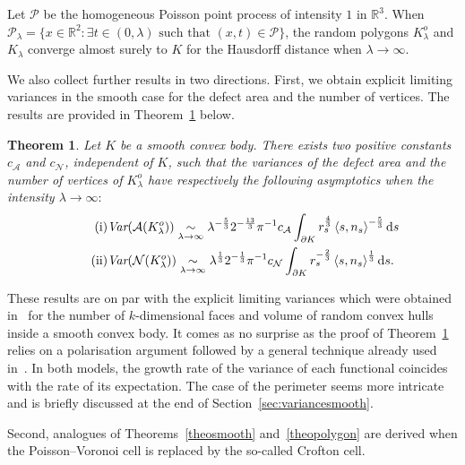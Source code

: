 \documentclass[10pt]{amsart}
\newtheorem{theo}{Theorem}[section]
\theoremstyle{definition}\newtheorem{defi}[theo]{Definition}\newtheorem{rema}[theo]{Remark}\newtheorem{exam}[theo]{Example}\newtheorem{exem}[theo]{Example}\newtheorem{nota}[theo]{Notation}
\newcommand{\cA}{\mathcal{A}}
\newcommand{\cN}{\mathcal{N}}
\newcommand{\cP}{\mathcal{P}}
\newcommand{\dd}{\mathrm{d}}
\newcommand{\R}{\mathbb{R}}
\newcommand{\pass}{\vspace{0.3cm}\noindent}
\let\oldexists\exists
\renewcommand*{\exists}{\mathrel{\oldexists}}
\begin{document}
\begin{coro}\label{cor:bonustrack}
Let ${\cP}$ be the homogeneous Poisson point process of intensity $1$ in $\R^3$. When ${\cP}_\lambda=\{x\in\R^2:\exists t\in (0,\lambda) \text{ such that } (x,t)\in \cP\}$, the random polygons $K_\lambda^o$ and $K_\lambda$ converge almost surely to $K$ for the Hausdorff distance when $\lambda\to\infty$.
\end{coro}

We also collect further results in two directions. First, we obtain explicit limiting variances in the smooth case for the defect area and the number of vertices. The results are provided in Theorem~\ref{theo:var} below.


\begin{theo}\label{theo:var}
Let $K$ be a smooth convex body. There exists two positive constants $c_{\cA}$ and $c_{\cN}$, independent of $K$, such that the variances of the defect area and the number of vertices of $K_{\lambda}^o$ have respectively the following asymptotics when the intensity $\lambda\to\infty:$
\begin{align}
\tag{$\rm i$}\label{theo1.5.i} &\emph{Var}(\cA(K_{\lambda}^o))\underset{\lambda\to\infty}{\sim}\lambda^{-\frac{5}{3}}2^{-\frac{13}{3}}\pi^{-1}c_{\cA}\int_{\partial K} r_s^{\frac4{3}}\left\langle s,n_s\right\rangle^{-\frac{5}{3}}\dd s\\
\tag{$\rm ii$}\label{theo1.5.ii} &\emph{Var}(\cN(K_{\lambda}^o))\underset{\lambda\to\infty}{\sim}\lambda^{\frac{1}{3}}2^{-\frac{1}{3}}\pi^{-1}c_{\cN}\int_{\partial K} r_s^{-\frac{2}{3}}\left\langle s,n_s\right\rangle^{\frac1{3}}\dd s.
\end{align}
\end{theo}


These results are on par with the explicit limiting variances which were obtained in~\cite{cy14} for the number of $k$-dimensional faces and volume of random convex hulls inside a smooth convex body. It comes as no surprise as the proof of Theorem~\ref{theo:var} relies on a polarisation argument followed by a general technique already used in~\cite{cy14}. In both models, the growth rate of the variance of each functional coincides with the rate of its expectation. The case of the perimeter seems more intricate and is briefly discussed at the end of Section~\ref{sec:variancesmooth}.

Second, analogues of Theorems~\ref{theosmooth} and~\ref{theopolygon} are derived when the Poisson--Voronoi cell is replaced by the so-called Crofton cell.
\end{document}
